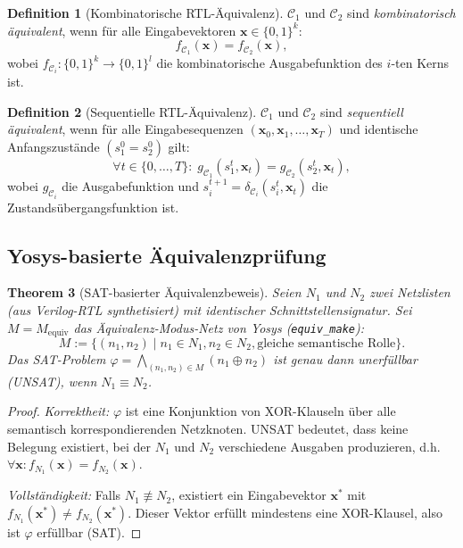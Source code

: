 ﻿\documentclass[a4paper,12pt]{article}
\theoremstyle{plain}
\newtheorem{theorem}{Theorem}[section]
\theoremstyle{definition}
\newtheorem{definition}[theorem]{Definition}
\theoremstyle{remark}
\begin{document}
\begin{definition}[Kombinatorische RTL-Äquivalenz]\label{def:rtl_equiv}
$\mathcal{C}_1$ und $\mathcal{C}_2$ sind \emph{kombinatorisch äquivalent},
wenn für alle Eingabevektoren $\mathbf{x} \in \{0,1\}^k$:
\[
  f_{\mathcal{C}_1}(\mathbf{x}) = f_{\mathcal{C}_2}(\mathbf{x}),
\]
wobei $f_{\mathcal{C}_i}: \{0,1\}^k \to \{0,1\}^l$ die kombinatorische
Ausgabefunktion des $i$-ten Kerns ist.
\end{definition}

\begin{definition}[Sequentielle RTL-Äquivalenz]\label{def:seq_equiv}
$\mathcal{C}_1$ und $\mathcal{C}_2$ sind \emph{sequentiell äquivalent},
wenn für alle Eingabesequenzen $(\mathbf{x}_0, \mathbf{x}_1, \ldots, \mathbf{x}_T)$
und identische Anfangszustände $(s_1^0 = s_2^0)$ gilt:
\[
  \forall t \in \{0,\ldots,T\}:\; g_{\mathcal{C}_1}(s_1^t, \mathbf{x}_t)
  = g_{\mathcal{C}_2}(s_2^t, \mathbf{x}_t),
\]
wobei $g_{\mathcal{C}_i}$ die Ausgabefunktion und
$s_i^{t+1} = \delta_{\mathcal{C}_i}(s_i^t, \mathbf{x}_t)$
die Zustandsübergangsfunktion ist.
\end{definition}

\subsection{Yosys-basierte Äquivalenzprüfung}\label{ssec:yosys}

\begin{theorem}[SAT-basierter Äquivalenzbeweis]\label{thm:sat_equiv}
Seien $N_1$ und $N_2$ zwei Netzlisten (aus Verilog-RTL synthetisiert)
mit identischer Schnittstellensignatur. Sei $M = M_\mathrm{equiv}$
das Äquivalenz-Modus-Netz von Yosys (\texttt{equiv\_make}):
\[
  M := \{(n_1, n_2) \mid n_1 \in N_1, n_2 \in N_2,
        \text{gleiche semantische Rolle}\}.
\]
Das SAT-Problem $\varphi = \bigwedge_{(n_1,n_2) \in M} (n_1 \oplus n_2)$
ist genau dann \emph{unerfüllbar} (UNSAT), wenn $N_1 \equiv N_2$.
\end{theorem}
\begin{proof}
\textit{Korrektheit:}
$\varphi$ ist eine Konjunktion von XOR-Klauseln über alle
semantisch korrespondierenden Netzknoten. UNSAT bedeutet,
dass keine Belegung existiert, bei der $N_1$ und $N_2$
verschiedene Ausgaben produzieren, d.h.\ $\forall \mathbf{x}: f_{N_1}(\mathbf{x}) = f_{N_2}(\mathbf{x})$.

\textit{Vollständigkeit:}
Falls $N_1 \not\equiv N_2$, existiert ein Eingabevektor $\mathbf{x}^*$
mit $f_{N_1}(\mathbf{x}^*) \neq f_{N_2}(\mathbf{x}^*)$. Dieser Vektor
erfüllt mindestens eine XOR-Klausel, also ist $\varphi$ erfüllbar (SAT).
\end{proof}
\end{document}

